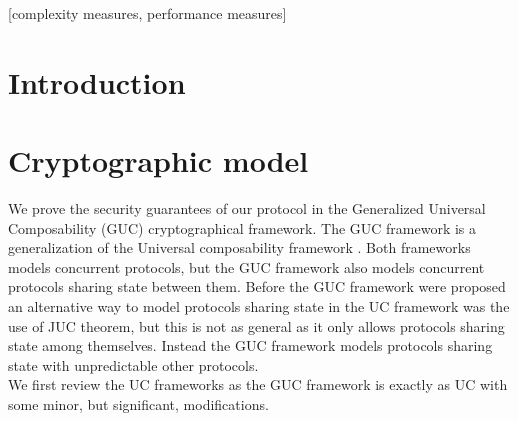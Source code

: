 \documentclass{acm_proc_article-sp}
\begin{document}
[complexity measures, performance measures]



\section{Introduction}

\section{Cryptographic model}

We prove the security guarantees of our protocol in the Generalized Universal Composability (GUC) cryptographical
framework. The GUC framework \cite{conf/tcc/CanettiDPW07} is a generalization of the Universal composability
framework \cite{conf/focs/Canetti01}. Both frameworks models concurrent protocols, but the GUC framework also
models concurrent protocols sharing state between them. Before the GUC framework were proposed an alternative way
to model protocols sharing state in the UC framework was the use of JUC theorem, but this is not as general as
it only allows protocols sharing state among themselves. Instead the GUC framework models protocols sharing state with
unpredictable other protocols.\\
We first review the UC frameworks as the GUC framework is exactly as UC with some minor, but significant, modifications.
\end{document}
